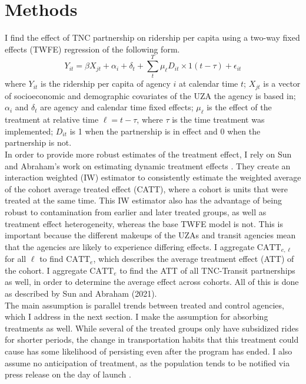 \documentclass [12pt]{report}
\begin{document}
\section*{Methods}
I find the effect of TNC partnership on ridership per capita using a two-way fixed effects (TWFE) regression of the following form. $$Y_{it} = \beta X_{jt} + \alpha_i + \delta_t + \sum_{t}^T \mu_{\ell} D_{it} \times 1(t -\tau) + \epsilon_{it}$$ where $Y_{it}$ is the ridership per capita of agency $i$ at calendar time $t$; $X_{jt}$ is a vector of socioeconomic and demographic covariates of the UZA the agency is based in; $\alpha_i$ and $\delta_t$ are agency and calendar time fixed effects; $\mu_{\ell}$ is the effect of the treatment at relative time $\ell = t-\tau$, where $\tau$ is the time treatment was implemented; $D_{it}$ is 1 when the partnership is in effect and 0 when the partnership is not.\\
\indent In order to provide more robust estimates of the treatment effect, I rely on Sun and Abraham's work on estimating dynamic treatment effects \parencite{sunab}. They create an interaction weighted (IW) estimator to consistently estimate the weighted average of the cohort average treated effect (CATT), where a cohort is units that were treated at the same time. This IW estimator also has the advantage of being robust to contamination from earlier and later treated groups, as well as treatment effect heterogeneity, whereas the base TWFE model is not. This is important because the different makeups of the UZAs and transit agencies mean that the agencies are likely to experience differing effects. I aggregate $\text{CATT}_{e,\ell}$ for all $\ell$ to find $\text{CATT}_{e}$, which describes the average treatment effect (ATT) of the cohort. I aggregate $\text{CATT}_{e}$ to find the ATT of all TNC-Transit partnerships as well, in order to determine the average effect across cohorts. All of this is done as described by Sun and Abraham (2021). \\
\indent The main assumption is parallel trends between treated and control agencies, which I address in the next section. I make the assumption for absorbing treatments as well. While several of the treated groups only have subsidized rides for shorter periods, the change in transportation habits that this treatment could cause has some likelihood of persisting even after the program has ended. I also assume no anticipation of treatment, as the population tends to be notified via press release on the day of launch \parencite{tampa}.  
\end{document}
